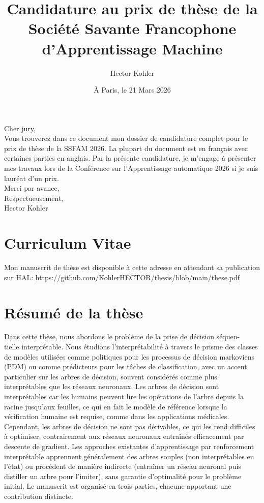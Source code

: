 \documentclass{article}
\title{Candidature au prix de thèse de la Société Savante Francophone d'Apprentissage Machine}
\author{Hector Kohler}
\date{À Paris, le 21 Mars 2026}
\begin{document}
\maketitle
\noindent
Cher jury,\\

Vous trouverez dans ce document mon dossier de candidature complet pour le prix de thèse de la SSFAM 2026.
La plupart du document est en français avec certaines parties en anglais.
Par la présente candidature, je m'engage à présenter mes travaux lors de la Conférence sur l'Apprentissage automatique 2026 si je suis lauréat d'un prix.
\\

\noindent Merci par avance,\\
Respectueusement,\\
Hector Kohler
\tableofcontents{}
\newpage
\section{Curriculum Vitae}
Mon manuscrit de thèse est disponible à cette adresse en attendant sa publication sur HAL: \url{https://github.com/KohlerHECTOR/thesis/blob/main/these.pdf}

\newpage
\section{Résumé de la thèse}
Dans cette thèse, nous abordons le problème de la prise de décision séquen-\\tielle interprétable.
Nous étudions l'interprétabilité à travers le prisme des classes de modèles utilisées comme politiques pour les processus de décision markoviens (PDM) ou comme prédicteurs pour les tâches de classification, avec un accent particulier sur les arbres de décision, souvent considérés comme plus interprétables que les réseaux neuronaux.
Les arbres de décision sont interprétables car les humains peuvent lire les opérations de l'arbre depuis la racine jusqu'aux feuilles, ce qui en fait le modèle de référence lorsque la vérification humaine est requise, comme dans les applications médicales.
Cependant, les arbres de décision ne sont pas dérivables, ce qui les rend difficiles à optimiser, contrairement aux réseaux neuronaux entraînés efficacement par descente de gradient.
Les approches existantes d'apprentissage par renforcement interprétable apprennent généralement des arbres souples (non interprétables en l'état) ou procèdent de manière indirecte (entraîner un réseau neuronal puis distiller un arbre pour l'imiter), sans garantie d'optimalité pour le problème initial.
Le manuscrit est organisé en trois parties, chacune apportant une contribution distincte.
\end{document}
